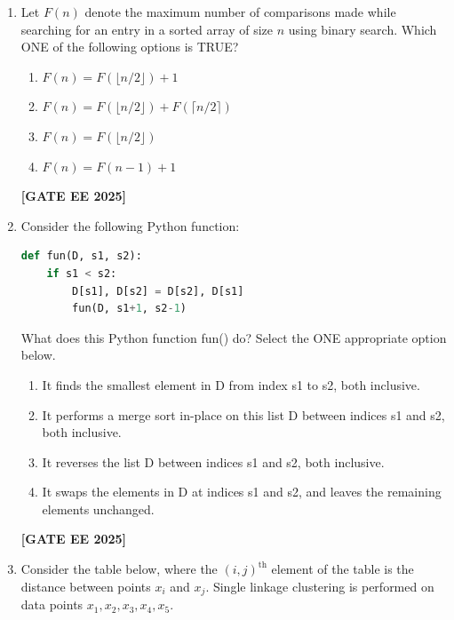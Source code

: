 \documentclass[journal]{IEEEtran}
\newcommand{\qfooter}{%
  \begin{flushright}\footnotesize\textbf{[GATE EE 2025]}\end{flushright}\vspace{1em}%
}
\begin{document}
\begin{enumerate}
\item Let $F(n)$ denote the maximum number of comparisons made while searching for an entry in a sorted array of size $n$ using binary search. Which ONE of the following options is TRUE?
\begin{multicols}{2}
\begin{enumerate}
\item $F(n) = F(\lfloor n/2 \rfloor) + 1$
\item $F(n) = F(\lfloor n/2 \rfloor) + F(\lceil n/2 \rceil)$
\item $F(n) = F(\lfloor n/2 \rfloor)$
\item $F(n) = F(n-1) + 1$
\end{enumerate} \qfooter
\end{multicols}

\item Consider the following Python function:
\begin{lstlisting}[language=Python]
def fun(D, s1, s2):
    if s1 < s2:
        D[s1], D[s2] = D[s2], D[s1]
        fun(D, s1+1, s2-1)
\end{lstlisting}
What does this Python function fun() do? Select the ONE appropriate option below.
\begin{multicols}{2}
\begin{enumerate}
\item It finds the smallest element in D from index s1 to s2, both inclusive.
\item It performs a merge sort in-place on this list D between indices s1 and s2, both inclusive.
\item It reverses the list D between indices s1 and s2, both inclusive.
\item It swaps the elements in D at indices s1 and s2, and leaves the remaining elements unchanged.
\end{enumerate} \qfooter
\end{multicols}

\item Consider the table below, where the $(i, j)^{\text{th}}$ element of the table is the distance between points $x_i$ and $x_j$. Single linkage clustering is performed on data points $x_1, x_2, x_3, x_4, x_5$.




\end{enumerate}
\end{document}
